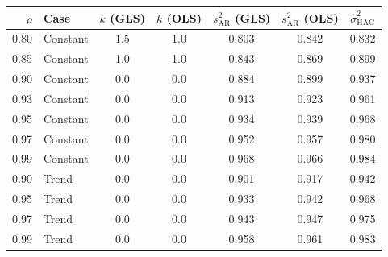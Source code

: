 \begin{tabular}{rlccccc}
\toprule
$\rho$ & Case & $k$ (GLS) & $k$ (OLS) & $s^2_{\mathrm{AR}}$ (GLS) & $s^2_{\mathrm{AR}}$ (OLS) & $\hat\sigma^2_{\mathrm{HAC}}$ \\
\midrule
0.80 & Constant & 1.5 & 1.0 & 0.803 & 0.842 & 0.832 \\
0.85 & Constant & 1.0 & 1.0 & 0.843 & 0.869 & 0.899 \\
0.90 & Constant & 0.0 & 0.0 & 0.884 & 0.899 & 0.937 \\
0.93 & Constant & 0.0 & 0.0 & 0.913 & 0.923 & 0.961 \\
0.95 & Constant & 0.0 & 0.0 & 0.934 & 0.939 & 0.968 \\
0.97 & Constant & 0.0 & 0.0 & 0.952 & 0.957 & 0.980 \\
0.99 & Constant & 0.0 & 0.0 & 0.968 & 0.966 & 0.984 \\
0.90 & Trend & 0.0 & 0.0 & 0.901 & 0.917 & 0.942 \\
0.95 & Trend & 0.0 & 0.0 & 0.933 & 0.942 & 0.968 \\
0.97 & Trend & 0.0 & 0.0 & 0.943 & 0.947 & 0.975 \\
0.99 & Trend & 0.0 & 0.0 & 0.958 & 0.961 & 0.983 \\
\bottomrule
\end{tabular}
